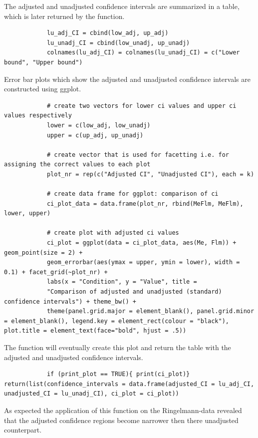 \documentclass[11pt]{article}
\begin{document}
		The adjusted and unadjusted confidence intervals are summarized in a table, which is later returned
		by the function.\\
		
		\begin{lstlisting}
			lu_adj_CI = cbind(low_adj, up_adj)
			lu_unadj_CI = cbind(low_unadj, up_unadj)
			colnames(lu_adj_CI) = colnames(lu_unadj_CI) = c("Lower bound", "Upper bound")
		\end{lstlisting}
		
		Error bar plots which show the adjusted and unadjusted confidence intervals are constructed using
		ggplot.\\
		
		\begin{lstlisting}
			# create two vectors for lower ci values and upper ci values respectively
			lower = c(low_adj, low_unadj)
			upper = c(up_adj, up_unadj)
			
			# create vector that is used for facetting i.e. for assigning the correct values to each plot
			plot_nr = rep(c("Adjusted CI", "Unadjusted CI"), each = k)
			
			# create data frame for ggplot: comparison of ci
			ci_plot_data = data.frame(plot_nr, rbind(MeFlm, MeFlm), lower, upper)
			
			# create plot with adjusted ci values
			ci_plot = ggplot(data = ci_plot_data, aes(Me, Flm)) + geom_point(size = 2) +
			geom_errorbar(aes(ymax = upper, ymin = lower), width = 0.1) + facet_grid(~plot_nr) +
			labs(x = "Condition", y = "Value", title =
			"Comparison of adjusted and unadjusted (standard) confidence intervals") + theme_bw() +
			theme(panel.grid.major = element_blank(), panel.grid.minor = element_blank(), legend.key = element_rect(colour = "black"), plot.title = element_text(face="bold", hjust = .5))
		\end{lstlisting}
		
		The function will eventually create this plot and return the table with the adjusted and unadjusted confidence intervals.\\
		
		\begin{lstlisting}
			if (print_plot == TRUE){ print(ci_plot)} return(list(confidence_intervals = data.frame(adjusted_CI = lu_adj_CI, unadjusted_CI = lu_unadj_CI), ci_plot = ci_plot))
		\end{lstlisting}	
		As expected the application of this function on the Ringelmann-data revealed that the adjusted confidence regions become narrower then there unadjusted counterpart.\\
		
\end{document}

